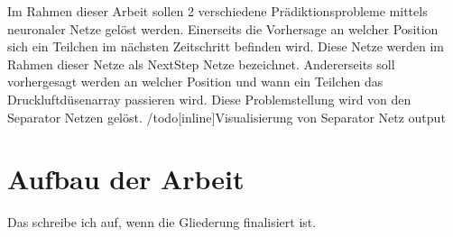Im Rahmen dieser Arbeit sollen 2 verschiedene Prädiktionsprobleme mittels neuronaler Netze gelöst werden.
Einerseits die Vorhersage an welcher Position sich ein Teilchen im nächsten Zeitschritt befinden wird.
Diese Netze werden im Rahmen dieser Netze als NextStep Netze bezeichnet.
Andererseits soll vorhergesagt werden an welcher Position und wann ein Teilchen das Druckluftdüsenarray passieren wird.
Diese Problemstellung wird von den Separator Netzen gelöst.
/todo[inline]{Visualisierung von Separator Netz output}



\section{Aufbau der Arbeit}

Das schreibe ich auf, wenn die Gliederung finalisiert ist.


